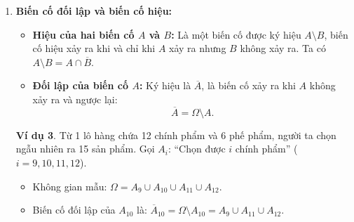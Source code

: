 \documentclass[12pt,a4paper]{article}
\theoremstyle{definition}
\newtheorem{vidu}{Ví dụ}[section]
\begin{document}
\begin{enumerate}[label=\alph*), leftmargin=1.5em]
    \begin{vidu}
    Một người thợ săn bắn 2 viên đạn vào một con thú và con thú sẽ chết nếu nó bị trúng cả hai viên đạn.
    Gọi $A_i$: ``Viên đạn thứ $i$ trúng con thú'' ($i = 1, 2$);
    $A$: ``Con thú bị trúng đạn'';
    $B$: ``Con thú bị chết''.\\
    Khi đó: $A = A_1 \cup A_2$ và $B = A_1 \cap A_2 = A_1 A_2$.
    \end{vidu}

    \begin{vidu}
    Xét phép thử gieo hai hạt lúa.
    Gọi $N_i$: ``Hạt lúa thứ $i$ nảy mầm''; $K_i$: ``Hạt lúa thứ $i$ không nảy mầm'' ($i = 1, 2$).
    Gọi $A$: ``Có đúng 1 hạt lúa nảy mầm''.
    \begin{itemize}
        \item Không gian mẫu: $\Omega = \{K_1 K_2,\ N_1 K_2,\ K_1 N_2,\ N_1 N_2\}$.
        \item Các biến cố sơ cấp: $\omega_1 = K_1 K_2,\ \omega_2 = N_1 K_2,\ \omega_3 = K_1 N_2,\ \omega_4 = N_1 N_2$.
        \item Biến cố $A = N_1 K_2 \cup K_1 N_2$ không phải là biến cố sơ cấp.
    \end{itemize}
    \end{vidu}

    \item \textbf{Biến cố đối lập và biến cố hiệu:}
    \begin{itemize}
        \item \textbf{Hiệu của hai biến cố $A$ và $B$:} Là một biến cố được ký hiệu $A \setminus B$, biến cố hiệu xảy ra khi và chỉ khi $A$ xảy ra nhưng $B$ không xảy ra. Ta có $A \setminus B = A \cap \overline{B}$.
        \item \textbf{Đối lập của biến cố $A$:} Ký hiệu là $\overline{A}$, là biến cố xảy ra khi $A$ không xảy ra và ngược lại:
        \[
        \overline{A} = \Omega \setminus A.
        \]
    \end{itemize}

    \begin{vidu}
    Từ 1 lô hàng chứa 12 chính phẩm và 6 phế phẩm, người ta chọn ngẫu nhiên ra 15 sản phẩm.
    Gọi $A_i$: ``Chọn được $i$ chính phẩm'' ($i = 9, 10, 11, 12$).
    \begin{itemize}
        \item Không gian mẫu: $\Omega = A_9 \cup A_{10} \cup A_{11} \cup A_{12}$.
        \item Biến cố đối lập của $A_{10}$ là: $\overline{A}_{10} = \Omega \setminus A_{10} = A_9 \cup A_{11} \cup A_{12}$.
    \end{itemize}
    \end{vidu}
\end{enumerate}
\end{document}
